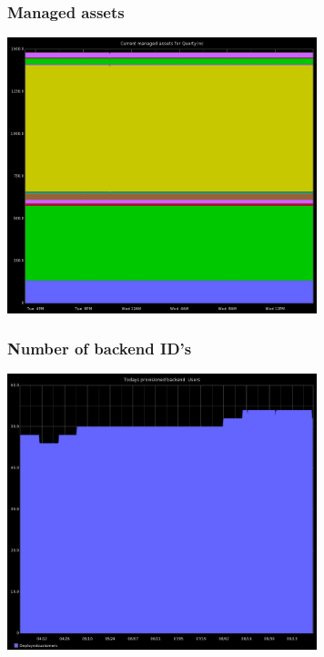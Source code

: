 \documentclass[presentation]{beamer}
\begin{document}
\begin{frame}
\frametitle{Managed assets}

    \begin{center}
        \includegraphics[height=8cm]{files/managed.png}\\
    \end{center}
\end{frame}

\begin{frame}
\frametitle{Number of backend ID's}

    \begin{center}
        \includegraphics[height=8cm]{files/graphite.png}\\
    \end{center}
\end{frame}
\end{document}
